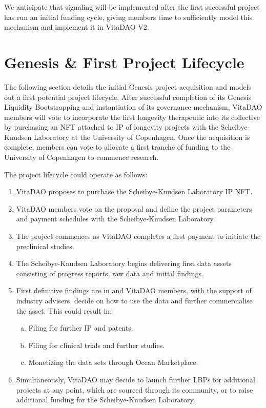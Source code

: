 \documentclass[12pt,letterpaper]{article}
\begin{document}
We anticipate that signaling will be implemented after the first successful project has run an initial funding cycle, giving members time to sufficiently model this mechanism and implement it in VitaDAO V2.

\section{Genesis \& First Project Lifecycle}
The following section details the initial Genesis project acquisition and models out a first potential project lifecycle. After successful completion of its Genesis Liquidity Bootstrapping and instantiation of its governance mechanism, VitaDAO members will vote to incorporate the first longevity therapeutic into its collective by purchasing an NFT attached to IP of longevity projects with the Scheibye-Knudsen Laboratory at the University of Copenhagen. Once the acquisition is complete, members can vote to allocate a first tranche of funding to the University of Copenhagen to commence research.

The project lifecycle could operate as follows:
\begin{enumerate}
\item VitaDAO proposes to purchase the Scheibye-Knudsen Laboratory IP NFT.
\item VitaDAO members vote on the proposal and define the project parameters and payment schedules with the Scheibye-Knudsen Laboratory.
\item The project commences as VitaDAO completes a first payment to initiate the preclinical studies.
\item The Scheibye-Knudsen Laboratory begins delivering first data assets consisting of progress reports, raw data and initial findings.
\item First definitive findings are in and VitaDAO members, with the support of industry advisers, decide on how to use the data and further commercialise the asset. This could result in:
\begin{enumerate}[a.]
\item Filing for further IP and patents.
\item Filing for clinical trials and further studies.
\item Monetizing the data sets through Ocean Marketplace.
\end{enumerate}
\item Simultaneously, VitaDAO may decide to launch further LBPs for additional projects at any point, which are sourced through its community, or to raise additional funding for the Scheibye-Knudsen Laboratory.
\end{enumerate}
\end{document}
